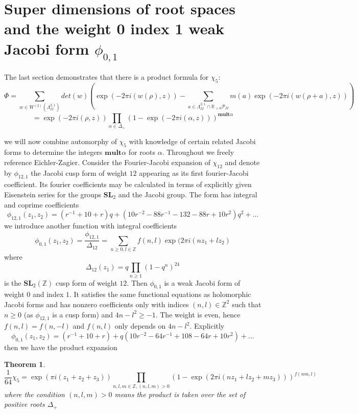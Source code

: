 \documentclass[9pt]{amsart} \usepackage[utf8]{inputenc}
\newtheorem{theorem}{Theorem}
\newcommand{\Z}{\mathbb{Z}} \newcommand{\C}{\mathbb{C}}
\newcommand{\R}{\mathbb{R}} \newcommand{\La}{\Lambda}
\newcommand{\SL}{\mathbf{SL}}
\newcommand{\Poly}{\mathcal{P}}
\begin{document}
\section{Super dimensions of root spaces and the weight 0 index 1 weak Jacobi
form $\phi_{0,1}$}

The last section demonstrates that there is a product formula for
$\chi_5$:
$$\Phi = \sum_{w \in W^{(2)}(\La^{2,1}_{II})} det(w)
(\exp(-2\pi i(w(\rho), z)) - \sum_{a\in \La^{2,1}_{II} \cap \R_{>0}
\Poly_{II}} m(a) \exp(-2\pi i(w(\rho + a), z)) ) $$ $$= \exp(-2\pi i(\rho,z))
\displaystyle\prod_{\alpha \in \Delta_+} (1 - \exp(-2\pi i
(\alpha,z)))^{\textbf{mult}\alpha}$$

we will now combine automorphy of $\chi_5$ with knowledge of certain
related Jacobi forms to determine the integers $\textbf{mult}\alpha$ for
roots $\alpha$.
Throughout we freely reference Eichler-Zagier\cite{EZ:1}.
Consider the Fourier-Jacobi expansion of $\chi_{12}$ and denote by
$\phi_{12,1}$ the Jacobi cusp form of weight $12$ appearing as its first
fourier-Jacobi coefficient. Its fourier coefficients may be calculated
in terms of explicitly given Eisenstein series for the groups $\SL_2$
and the Jacobi group. The form has integral and coprime coefficients
$$\phi_{12,1}(z_1,z_2) = (r^{-1} + 10 + r)q + (10r^{-2} -88r^{-1} -132
-88r +10r^{2})q^2 + \ldots$$ we introduce another function with integral
coefficients $$\phi_{0,1} (z_1,z_2) =
\frac{\phi_{12,1}}{\Delta_{12}} = \sum_{n\geq 0, l\in \Z}
f(n,l)\exp(2\pi i(nz_1 + lz_2)$$ where $$\Delta_{12}(z_1) = q\displaystyle\prod_{n\geq
1}(1 - q^n)^{24}$$ is the $\SL_2(\Z)$ cusp form of weight $12$. Then
$\phi_{0,1}$ is a weak Jacobi form of weight $0$ and index $1$. It
satisfies the same functional equations as holomorphic Jacobi forms and
has nonzero coefficients only with indices $(n,l) \in \Z^2$ such that
$n\geq 0$ (as $\phi_{12,1}$ is a cusp form) and $4n - l^2 \geq -1$. The
weight is even, hence $f(n,l) = f(n,-l)$ and $f(n,l)$ only depends on
$4n-l^2$. Explicitly $$\phi_{0,1} (z_1,z_2) = (r^{-1} +10 + r) +
q(10r^{-2} - 64r^{-1} + 108  -64r + 10r^2) + \ldots$$
then we have the product expansion

\begin{theorem}
$$\frac{1}{64} \chi_5 = \exp(\pi i(z_1 + z_2 + z_3)) \displaystyle\prod_{n,l,m \in \Z,
(n,l,m) >0} (1 - \exp(2\pi i(nz_1 + lz_2 + mz_3)))^{f(nm,l)}$$ where the
condition $(n,l,m) > 0$ means the product is taken over the set of
positive roots $\Delta_+$
\end{theorem}
\end{document}
